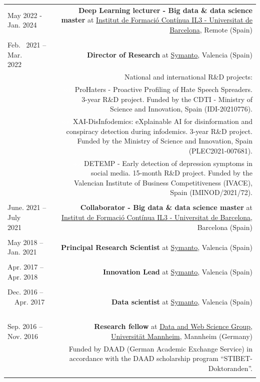 \documentclass[10pt]{article}
\begin{document}
\begin{tabular}{L!{\VRule}R}
May 2022 - Jan. 2024~~~ &{\textbf{Deep Learning lecturer - Big data \& data science master} at  \href{https://www.il3.ub.edu/}{Institut de Formació Contínua IL3 - Universitat de Barcelona}, Remote (Spain)}\\
&\\

Feb.~ 2021 -- Mar. 2022~~~~ &{\textbf{Director of Research} at \href{https://www.symanto.com/}{Symanto}, Valencia (Spain)}\\
&\scriptsize{National and international R\&D projects:}\\
&\scriptsize{\textcolor{white}{ssss}ProHaters - Proactive Profiling of Hate Speech Spreaders. 3-year R\&D project. Funded by the CDTI - Ministry of Science and Innovation, Spain (IDI-20210776).}\\
&\scriptsize{\textcolor{white}{ssss}XAI-DisInfodemics: eXplainable AI for disinformation and conspiracy detection during infodemics. 3-year R\&D project. Funded by the Ministry of Science and Innovation, Spain (PLEC2021-007681).}\\
&\scriptsize{\textcolor{white}{ssss}DETEMP - Early detection of depression symptoms in social media. 15-month R\&D project. Funded by the Valencian Institute of Business Competitiveness (IVACE), Spain (IMINOD/2021/72)}. \\&\\

June. 2021 -- July 2021~~~~~ &{\textbf{Collaborator - Big data \& data science master} at  \href{https://www.il3.ub.edu/}{Institut de Formació Contínua IL3 - Universitat de Barcelona}, Barcelona (Spain)}\\
&\\
May 2018 -- Jan. 2021~~~ &{\textbf{Principal Research Scientist} at \href{https://www.symanto.com/}{Symanto}, Valencia (Spain)}\\&\\
Apr. 2017 -- Apr. 2018~~~ &{\textbf{Innovation Lead} at \href{https://www.symanto.com/}{Symanto}, Valencia (Spain)}\\&\\
Dec. 2016 -- ~~Apr. 2017 ~~&{\textbf{Data scientist} at \href{https://www.symanto.com/}{Symanto}, Valencia (Spain)}\\&\\
Sep. 2016 -- Nov. 2016 ~~&{\textbf{Research fellow} at \href{http://dws.informatik.uni-mannheim.de/en/home/}{Data and Web Science Group, Universit{\"a}t Mannheim}, Mannheim (Germany)}\\
&\scriptsize{Funded by DAAD (German Academic Exchange Service) in accordance with the DAAD scholarship program ``STIBET-Doktoranden''.}\\&\\


\end{tabular}
\end{document}
